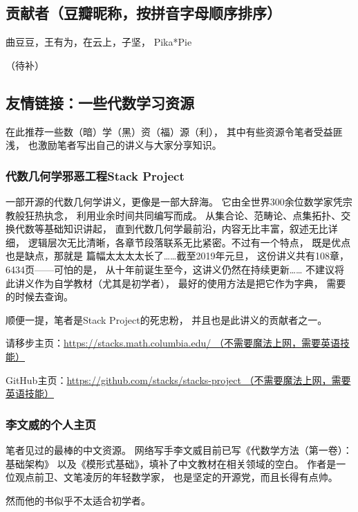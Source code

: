 \subsection*{贡献者（豆瓣昵称，按拼音字母顺序排序）}

曲豆豆，王有为，在云上，子坚，
Pika*Pie

（待补）

\vsp

\subsection*{友情链接：一些代数学习资源}

在此推荐一些数（暗）学（黑）资（福）源（利），
其中有些资源令笔者受益匪浅，
也激励笔者写出自己的讲义与大家分享知识。

\subsubsection*{代数几何学邪恶工程Stack Project}


一部开源的代数几何学讲义，更像是一部大辞海。
它由全世界300余位数学家凭宗教般狂热执念，
利用业余时间共同编写而成。
从集合论、范畴论、点集拓扑、交换代数等基础知识讲起，
直到代数几何学最前沿，内容无比丰富，叙述无比详细，
逻辑层次无比清晰，各章节段落联系无比紧密。不过有一个特点，
既是优点也是缺点，那就是
篇幅太太太太长了……截至2019年元旦，
这份讲义共有108章，6434页——可怕的是，
从十年前诞生至今，这讲义仍然在持续更新……
不建议将此讲义作为自学教材（尤其是初学者），
最好的使用方法是把它作为字典，
需要的时候去查询。

顺便一提，笔者是Stack Project的死忠粉，
并且也是此讲义的贡献者之一。\vsp

请移步主页：\href{https://stacks.math.columbia.edu/}
{https://stacks.math.columbia.edu/
（不需要魔法上网，需要英语技能）}\vsp

GitHub主页：\href{https://github.com/stacks/stacks-project}
{https://github.com/stacks/stacks-project
（不需要魔法上网，需要英语技能）}

\subsubsection*{李文威的个人主页}

笔者见过的最棒的中文资源。
网络写手李文威目前已写《代数学方法（第一卷）：基础架构》
以及《模形式基础》，填补了中文教材在相关领域的空白。
作者是一位观点前卫、文笔凌厉的年轻数学家，
也是坚定的开源党，而且长得有点帅。

然而他的书似乎不太适合初学者。\vsp

